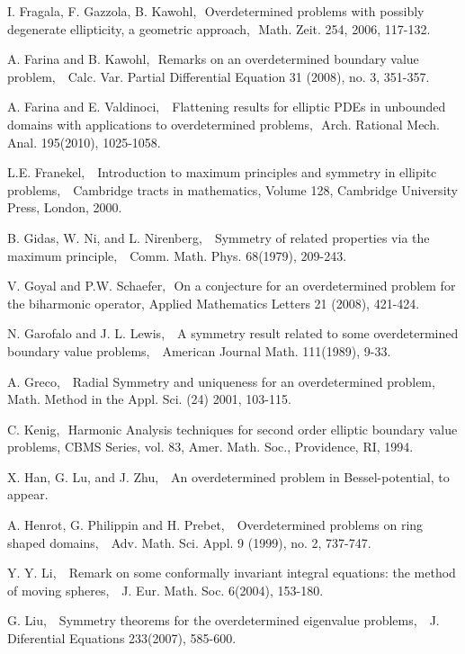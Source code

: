 \documentclass[12pt]{amsproc}
\theoremstyle{plain}
\numberwithin{equation}{section}
\begin{document}
\begin{thebibliography}{CL}
 I. Fragala, F. Gazzola, B. Kawohl, \,\,Overdetermined problems with possibly degenerate ellipticity, a geometric approach,\,\, Math. Zeit. 254, 2006, 117-132.

 A. Farina and B. Kawohl, \,\,Remarks on an overdetermined boundary value
problem, \,\,  Calc. Var. Partial Differential Equation 31 (2008),
no. 3, 351-357.

 A. Farina and E. Valdinoci, \,\, Flattening results for elliptic PDEs in unbounded domains with applications to overdetermined problems,\,\, Arch. Rational Mech. Anal. 195(2010), 1025-1058.

 L.E. Franekel, \,\, Introduction to maximum
principles and symmetry in ellipitc problems, \,\, Cambridge tracts
in mathematics, Volume 128, Cambridge University  Press, London,
2000.

 B. Gidas, W. Ni, and L. Nirenberg, \,\, Symmetry of related properties via the maximum principle,
\,\, Comm. Math. Phys. 68(1979), 209-243.

 V. Goyal and P.W. Schaefer,\,\, On a conjecture for an overdetermined problem for the biharmonic operator, Applied Mathematics Letters 21 (2008), 421-424.

 N. Garofalo and J. L. Lewis, \,\, A symmetry result
related to some overdetermined boundary value problems, \,\,
American Journal Math. 111(1989), 9-33.

 A. Greco, \,\, Radial Symmetry and uniqueness for an overdetermined problem, \,\, Math. Method in the Appl. Sci. (24) 2001, 103-115.

 C. Kenig, \,\,Harmonic Analysis techniques for second order elliptic boundary value problems, CBMS Series, vol. 83, Amer. Math. Soc., Providence, RI, 1994.

 
 X. Han, G. Lu, and J. Zhu, \,\, An overdetermined
problem in Bessel-potential, to appear.

 A. Henrot, G. Philippin and H. Prebet, \,\, Overdetermined problems on ring shaped domains, \,\, Adv. Math. Sci. Appl. 9 (1999), no. 2, 737-747.

 Y. Y. Li, \,\, Remark on some conformally invariant integral equations: the method of moving
spheres, \,\, J. Eur. Math. Soc. 6(2004), 153-180.

 G. Liu, \,\,  Symmetry theorems for the overdetermined eigenvalue
problems, \,\, J. Diferential Equations 233(2007), 585-600.


\end{thebibliography}
\end{document}
